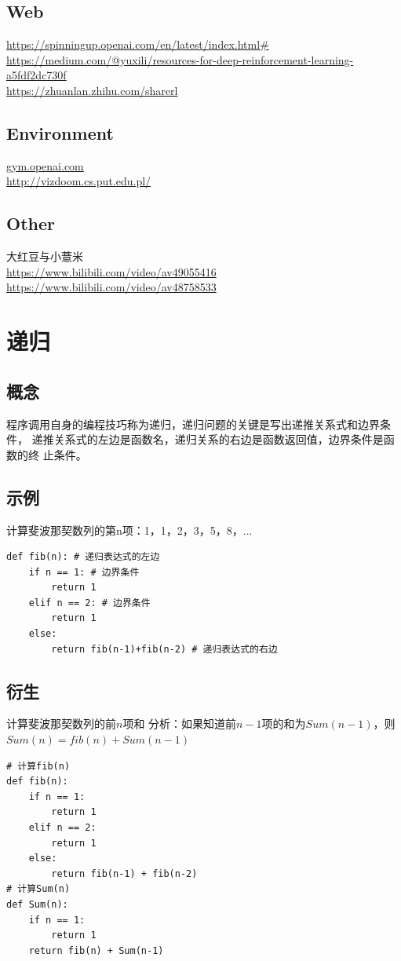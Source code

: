\documentclass{book}
\begin{document}
\section{Web}
\noindent \url{https://spinningup.openai.com/en/latest/index.html#}\\
\url{https://medium.com/@yuxili/resources-for-deep-reinforcement-learning-a5fdf2dc730f}\\
\url{https://zhuanlan.zhihu.com/sharerl}
\section{Environment}
\noindent \url{gym.openai.com}\\
\url{http://vizdoom.cs.put.edu.pl/}
\section{Other}
\noindent 大红豆与小薏米\\
\url{https://www.bilibili.com/video/av49055416}\\
\url{https://www.bilibili.com/video/av48758533}
\chapter{递归}
\section{概念}
程序调用自身的编程技巧称为递归，递归问题的关键是写出递推关系式和边界条件，
递推关系式的左边是函数名，递归关系的右边是函数返回值，边界条件是函数的终
止条件。
\section{示例}
计算斐波那契数列的第n项：1，1，2，3，5，8，...
\begin{lstlisting} 
def fib(n): # 递归表达式的左边
    if n == 1: # 边界条件
        return 1
    elif n == 2: # 边界条件
        return 1
    else:
        return fib(n-1)+fib(n-2) # 递归表达式的右边
\end{lstlisting}   
\section{衍生}
计算斐波那契数列的前$n$项和
分析：如果知道前$n-1$项的和为$Sum(n-1)$，则$Sum(n)=fib(n)+Sum(n-1)$
\begin{lstlisting} 
# 计算fib(n)
def fib(n): 
    if n == 1: 
        return 1
    elif n == 2: 
        return 1
    else:
        return fib(n-1) + fib(n-2) 
# 计算Sum(n)
def Sum(n):
    if n == 1:
        return 1
    return fib(n) + Sum(n-1)
\end{lstlisting}   
\end{document}
